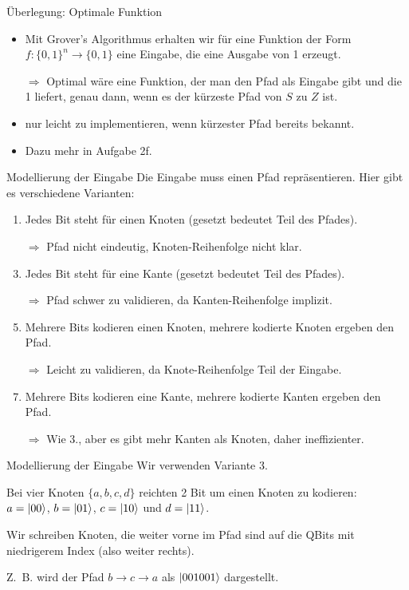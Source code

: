 \documentclass[fleqn,compress,utf8,aspectratio=169,t]{beamer}
\begin{document}
\begin{frame}{Überlegung: Optimale Funktion}
\begin{itemize}
	\item Mit Grover's Algorithmus erhalten wir für eine Funktion der Form $f: \{0, 1\}^n \rightarrow \{0, 1\}$ eine Eingabe, die eine Ausgabe von 1 erzeugt.
	\item[$\Rightarrow$] Optimal wäre eine Funktion, der man den Pfad als Eingabe gibt und die 1 liefert, genau dann, wenn es der kürzeste Pfad von $S$ zu $Z$ ist.
	\item nur leicht zu implementieren, wenn kürzester Pfad bereits bekannt.
	\item Dazu mehr in Aufgabe 2f.
\end{itemize}
\end{frame}

\begin{frame}{Modellierung der Eingabe}
Die Eingabe muss einen Pfad repräsentieren. Hier gibt es verschiedene Varianten:
\begin{enumerate}
	\item Jedes Bit steht für einen Knoten (gesetzt bedeutet Teil des Pfades).
	\item[] $\Rightarrow$ Pfad nicht eindeutig, Knoten-Reihenfolge nicht klar.
	\item Jedes Bit steht für eine Kante (gesetzt bedeutet Teil des Pfades).
	\item[] $\Rightarrow$ Pfad schwer zu validieren, da Kanten-Reihenfolge implizit.
	\item Mehrere Bits kodieren einen Knoten, mehrere kodierte Knoten ergeben den Pfad.
	\item[] $\Rightarrow$ Leicht zu validieren, da Knote-Reihenfolge Teil der Eingabe.
	\item Mehrere Bits kodieren eine Kante, mehrere kodierte Kanten ergeben den Pfad.
	\item[] $\Rightarrow$ Wie 3., aber es gibt mehr Kanten als Knoten, daher ineffizienter.
\end{enumerate}
\end{frame}

\begin{frame}{Modellierung der Eingabe}
Wir verwenden Variante 3.

Bei vier Knoten $\{a, b, c, d\}$ reichten 2 Bit um einen Knoten zu kodieren:\\
$a = \ket{00}$, $b = \ket{01}$, $c = \ket{10}$ und $d = \ket{11}$.

Wir schreiben Knoten, die weiter vorne im Pfad sind auf die QBits mit niedrigerem Index (also weiter rechts).

Z.~B. wird der Pfad $b \rightarrow c \rightarrow a$ als $\ket{001001}$ dargestellt.
\end{frame}
\end{document}

